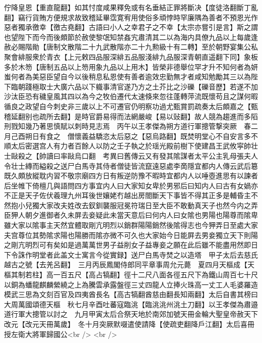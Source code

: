 佇降皇恩【重直龍翻】如其忖度咸果釋免或有名垂結正罪將斷决【度徒洛翻斷丁亂翻】竊行貨賄方便規求故致稽延畢霑寛宥用使俗多頑悖時罕廉隅為善者不預恩光作惡者獨承徼幸【徼古堯翻】古語曰小人之幸君子之不幸【太宗亦嘗引是言】斯之謂也望陛下而今而後頗節於赦使黎氓知禁姦宄肅清其二以為海内具僚九品以上每歲逢赦必賜階勛【唐制文散階二十九武散階亦二十九勲級十有二轉】至於朝野宴集公私聚會緋服衆於青衣【上元敕四品服深緋五品服淺緋九品服深青朝直遥翻下同】象板多於木笏【唐制五品以上笏用象九品以上用木】皆榮非德舉位罕才升不知何者為妍蚩何者為美惡臣望自今以後稍息私恩使有善者逾效忠勤無才者咸知勉勵其三以為陛下臨朝踐極取士大廣六品以下軄事清官遂乃方之土芥比之沙礫【礫音歷】若遂不加沙汰臣恐有穢皇風其四以為今之牧伯遷代太速倏來忽往蓬轉萍流既懷苟且之謀何暇循良之政望自今刺史非三歲以上不可遷官仍明察功過尤甄賞罰疏奏太后頗嘉之【甄稽延翻别也疏所去翻】是時官爵易得而法網嚴峻【易以䜴翻】故人競為趨進而多䧟刑戮知幾乃著思慎賦以刺時見志焉　丙午以王孝傑為朔方道行軍摠管撃突厥　春二月己酉朔日有食之　僧懷義益驕恣太后惡之【惡烏路翻】既焚明堂心不自安言多不順太后密選宫人有力者百餘人以防之壬子執之於瑶光殿前樹下使建昌王武攸寜帥壮士敺殺之【帥讀曰率敺烏口翻　考異曰舊傳云又有發其隂謀者太平公主乳母張夫人令壮士縳而縊殺之送尸白馬寺其侍者僧徒皆流竄遠惡處李啇隱宜都内人傳云武后簒既久頗放縱耽内習不敬宗廟四方日有叛逆防豫不暇時宜都内人以唾壺進思有以諫者后坐帷下倚檀几與語問四方事宜内人曰大家知女卑於男邪后曰知内人曰古有女媧亦不正是天子佐伏羲理九州耳後世孃姥冇越出房閤斷天下事皆不得其正多是輔昏主不然抱小兒獨大家改夫姓改去釵釧襲服冠冕符瑞日至大臣不敢動真天子也然今内之弄臣狎人朝夕進御者久未屏去妾疑此未當天意后曰何内人曰女隂也男陽也陽尊而隂卑雖大家以隂事主天然宜體取剛亢明烈以銷群陽陽銷然後隂得志也今狎弄日至處大家夫宫尊位其勢隂求陽也陽勝而隂亦微不可久也大家始今日能屛去男妾獨立天下則陽之剛亢明烈可有矣如是過萬萬世男子益削女子益專妾之願在此后雖不能盡用然即日下令誅作明堂者此盖文士寓言今從實録】送尸白馬寺焚之以造塔　甲子太后去慈氏越古之號【去羌呂翻】　三月丙辰鳳閣侍郎同平章事周允元薨　夏四月天樞成【天樞其制若柱】高一百五尺【高占犒翻】徑十二尺八面各徑五尺下為鐵山周百七十尺以銅為蟠龍麒麟縈繞之上為騰雲承露盤徑三丈四龍人立捧火珠高一丈工人毛婆羅造模武三思為文刻百官及四夷酋長名【高古犒翻酋慈由翻長知兩翻】太后自書其榜曰大周萬國頌德天樞　秋七月辛酉吐蕃寇臨洮【臨洮洮州洮土刀翻】以王孝傑為肅邉道行軍大摠管以討之　九月甲寅太后合祭天地於南郊加號天冊金輪大聖皇帝赦天下改元【改元天冊萬歲】　冬十月突厥默啜遣使請降【使疏吏翻降戶江翻】太后喜冊授左衛大將軍歸國公<br />
<br />
